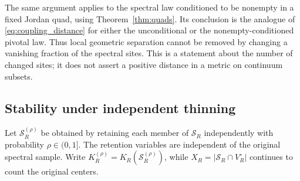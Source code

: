 \documentclass[11pt]{amsart}
\theoremstyle{remark}
\newcommand{\cS}{\mathcal S}
\begin{document}
The same argument applies to the spectral law conditioned to be nonempty in a fixed Jordan quad, using Theorem~\ref{thm:quads}. Its conclusion is the analogue of \eqref{eq:coupling_distance} for either the unconditional or the nonempty-conditioned pivotal law. Thus local geometric separation cannot be removed by changing a vanishing fraction of the spectral sites. This is a statement about the number of changed sites; it does not assert a positive distance in a metric on continuum subsets.

\subsection{Stability under independent thinning}\label{sec:thinning}

Let $\cS_R^{(\rho)}$ be obtained by retaining each member of $\cS_R$ independently with probability $\rho\in(0,1]$. The retention variables are independent of the original spectral sample. Write $K_R^{(\rho)}=K_R(\cS_R^{(\rho)})$, while $X_R=|\cS_R\cap V_R^\circ|$ continues to count the original centers.
\end{document}
